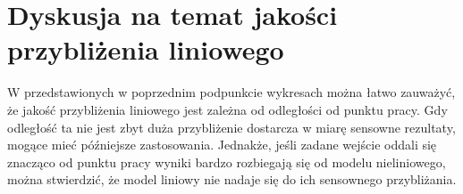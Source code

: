 \section{Dyskusja na temat jakości przybliżenia liniowego}
W przedstawionych w poprzednim podpunkcie wykresach można łatwo zauważyć, że jakość przybliżenia liniowego jest zależna od odległości od punktu pracy. Gdy odległość ta nie jest zbyt duża przybliżenie dostarcza w miarę sensowne rezultaty, mogące mieć późniejsze zastosowania. Jednakże, jeśli zadane wejście oddali się znacząco od punktu pracy wyniki bardzo rozbiegają się od modelu nieliniowego, można stwierdzić, że model liniowy nie nadaje się do ich sensownego przybliżania.



